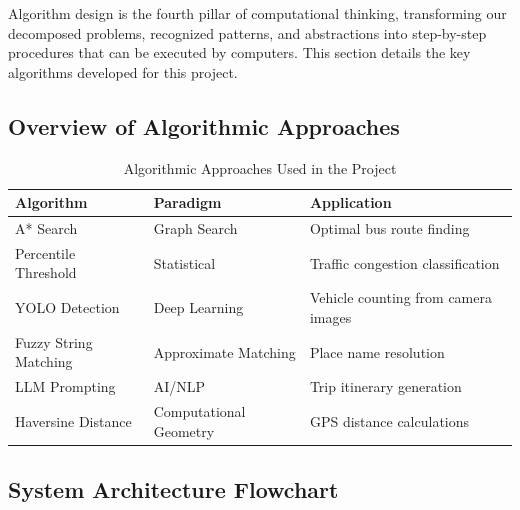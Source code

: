 Algorithm design is the fourth pillar of computational thinking, transforming our decomposed problems, recognized patterns, and abstractions into step-by-step procedures that can be executed by computers. This section details the key algorithms developed for this project.

\subsection{Overview of Algorithmic Approaches}

\begin{table}[H]
    \centering
    \renewcommand{\arraystretch}{1.3}
    \begin{tabularx}{\textwidth}{|l|l|X|}
        \hline
        \textbf{Algorithm} & \textbf{Paradigm} & \textbf{Application} \\
        \hline
        A* Search & Graph Search & Optimal bus route finding \\
        \hline
        Percentile Threshold & Statistical & Traffic congestion classification \\
        \hline
        YOLO Detection & Deep Learning & Vehicle counting from camera images \\
        \hline
        Fuzzy String Matching & Approximate Matching & Place name resolution \\
        \hline
        LLM Prompting & AI/NLP & Trip itinerary generation \\
        \hline
        Haversine Distance & Computational Geometry & GPS distance calculations \\
        \hline
    \end{tabularx}
    \caption{Algorithmic Approaches Used in the Project}
\end{table}

\subsection{System Architecture Flowchart}

